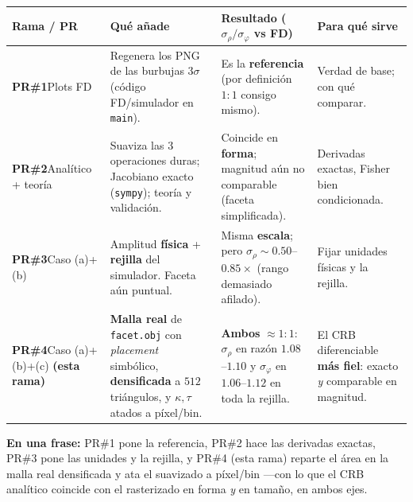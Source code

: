 \documentclass[11pt,a4paper]{article}
\begin{document}
\begin{center}
\renewcommand{\arraystretch}{1.35}
\begin{tabular}{@{}p{2.1cm}p{4.3cm}p{4.0cm}p{3.6cm}@{}}
\toprule
\textbf{Rama / PR} & \textbf{Qu\'e a\~nade} &
\textbf{Resultado ($\sigma_\rho/\sigma_\varphi$ vs FD)} & \textbf{Para qu\'e sirve}\\
\midrule
\textbf{PR\#1}\newline Plots FD &
Regenera los PNG de las burbujas $3\sigma$ (c\'odigo FD/simulador en \texttt{main}). &
Es la \textbf{referencia} (por definici\'on $1{:}1$ consigo mismo). &
Verdad de base; con qu\'e comparar.\\
\textbf{PR\#2}\newline Anal\'itico + teor\'ia &
Suaviza las 3 operaciones duras; Jacobiano exacto (\texttt{sympy}); teor\'ia y
validaci\'on. &
Coincide en \textbf{forma}; magnitud a\'un no comparable (faceta simplificada). &
Derivadas exactas, Fisher bien condicionada.\\
\textbf{PR\#3}\newline Caso (a)+(b) &
Amplitud \textbf{f\'isica} + \textbf{rejilla} del simulador. Faceta a\'un puntual. &
Misma \textbf{escala}; pero $\sigma_\rho\sim0.50$--$0.85\times$ (rango demasiado
afilado). &
Fijar unidades f\'isicas y la rejilla.\\
\textbf{PR\#4}\newline Caso (a)+(b)+(c) \textbf{(esta rama)} &
\textbf{Malla real} de \texttt{facet.obj} con \emph{placement} simb\'olico,
\textbf{densificada} a $512$ tri\'angulos, y $\kappa,\tau$ atados a p\'ixel/bin. &
\textbf{Ambos} $\approx1{:}1$: $\sigma_\rho$ en razón $1.08$--$1.10$ y
$\sigma_\varphi$ en $1.06$--$1.12$ en toda la rejilla. &
El CRB diferenciable \textbf{m\'as fiel}: exacto \emph{y} comparable en magnitud.\\
\bottomrule
\end{tabular}
\end{center}

\bigskip
\noindent\textbf{En una frase:} PR\#1 pone la referencia, PR\#2 hace las derivadas
exactas, PR\#3 pone las unidades y la rejilla, y PR\#4 (esta rama) reparte el
\'area en la malla real densificada y ata el suavizado a p\'ixel/bin ---con lo que
el CRB anal\'itico coincide con el rasterizado en forma \emph{y} en tama\~no, en
ambos ejes.
\end{document}
